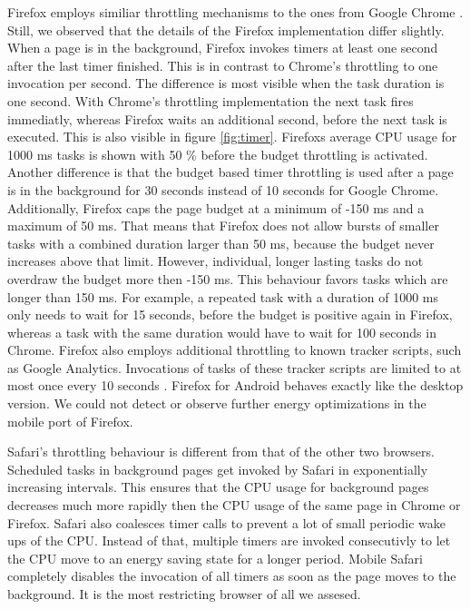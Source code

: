 \documentclass[
	ruledheaders=section,%
	class=report,%
	thesis={type=bachelor},%
	accentcolor=9c,%
	custommargins=true,%
	marginpar=false,%
	parskip=half-,%
	fontsize=11pt,%
]{tudapub}
\begin{document}
  Firefox employs similiar throttling mechanisms to the ones from Google Chrome \cite{mdn-page-visibility}. Still, we observed that the details of the Firefox implementation differ slightly. When a page is in the background, Firefox invokes timers at least one second after the last timer finished. This is in contrast to Chrome's throttling to one invocation per second. The difference is most visible when the task duration is one second. With Chrome's throttling implementation the next task fires immediatly, whereas Firefox waits an additional second, before the next task is executed. This is also visible in figure \ref{fig:timer}. Firefoxs average CPU usage for 1000 ms tasks is shown with 50 \% before the budget throttling is activated. Another difference is that the budget based timer throttling is used after a page is in the background for 30 seconds instead of 10 seconds for Google Chrome. Additionally, Firefox caps the page budget at a minimum of -150 ms and a maximum of 50 ms. That means that Firefox does not allow bursts of smaller tasks with a combined duration larger than 50 ms, because the budget never increases above that limit. However, individual, longer lasting tasks do not overdraw the budget more then -150 ms. This behaviour favors tasks which are longer than 150 ms. For example, a repeated task with a duration of 1000 ms only needs to wait for 15 seconds, before the budget is positive again in Firefox, whereas a task with the same duration would have to wait for 100 seconds in  Chrome. Firefox also employs additional throttling to known tracker scripts, such as Google Analytics. Invocations of tasks of these tracker scripts are limited to at most once every 10 seconds \cite{mdn-tracker-throttling}. Firefox for Android behaves exactly like the desktop version. We could not detect or observe further energy optimizations in the mobile port of Firefox. 

  Safari's throttling behaviour is different from that of the other two browsers. Scheduled tasks in background pages get invoked by Safari in exponentially increasing intervals. This ensures that the CPU usage for background pages decreases much more rapidly then the CPU usage of the same page in Chrome or Firefox. Safari also coalesces timer calls to prevent a lot of small periodic wake ups of the CPU. Instead of that, multiple timers are invoked consecutivly to let the CPU move to an energy saving state for a longer period. Mobile Safari completely disables the invocation of all timers as soon as the page moves to the background. It is the most restricting browser of all we assesed.
  
\end{document}
